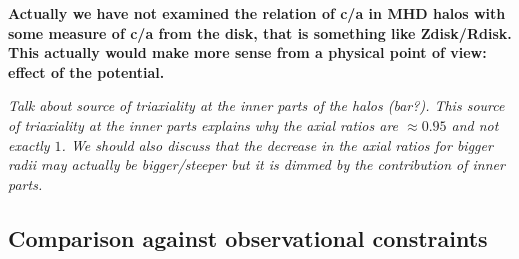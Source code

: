 \documentclass[a4paper,fleqn,usenatbib]{mnras}
\begin{document}
\textbf{Actually we have not examined the relation of c/a in MHD halos
  with some measure of c/a from the disk, that is something like
  Zdisk/Rdisk. This actually would make more sense from a physical
  point of view: effect of the potential. } 


\textit{ Talk about source of triaxiality at the inner parts of the
  halos (bar?). This source of triaxiality at the inner parts explains
  why the axial ratios are $\approx 0.95$ and not exactly $1$. We
  should also discuss that the decrease in the axial ratios for bigger
  radii may actually be bigger/steeper but it is dimmed by the
  contribution of inner parts.} 






\subsection{Comparison against observational constraints}
\end{document}
